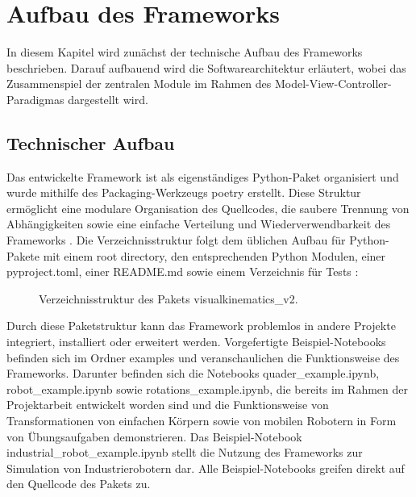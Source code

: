 \section{Aufbau des Frameworks}
In diesem Kapitel wird zunächst der technische Aufbau des Frameworks beschrieben.  
Darauf aufbauend wird die Softwarearchitektur erläutert,
wobei das Zusammenspiel der zentralen Module im Rahmen des Model-View-Controller-Paradigmas dargestellt wird.

\subsection{Technischer Aufbau}
Das entwickelte Framework ist als eigenständiges Python-Paket organisiert und wurde mithilfe des Packaging-Werkzeugs poetry erstellt.
Diese Struktur ermöglicht eine modulare Organisation des Quellcodes,
die saubere Trennung von Abhängigkeiten sowie eine einfache Verteilung und Wiederverwendbarkeit des Frameworks .
Die Verzeichnisstruktur folgt dem üblichen Aufbau für Python-Pakete mit einem root directory, den entsprechenden Python Modulen,
einer pyproject.toml, einer README.md sowie einem Verzeichnis für Tests :

\vspace{1em}
\begin{figure}[H]
\caption{Verzeichnisstruktur des Pakets visualkinematics\_v2.}
\label{fig:dir_structure}
\end{figure}
\vspace{1em}


Durch diese Paketstruktur kann das Framework problemlos in andere Projekte integriert, installiert oder erweitert werden.
Vorgefertigte Beispiel-Notebooks befinden sich im Ordner examples und veranschaulichen die Funktionsweise des Frameworks.
Darunter befinden sich die Notebooks quader\_example.ipynb, robot\_example.ipynb sowie rotations\_example.ipynb,
die bereits im Rahmen der Projektarbeit entwickelt worden sind und die Funktionsweise von Transformationen von einfachen Körpern
sowie von mobilen Robotern in Form von Übungsaufgaben demonstrieren.
Das Beispiel-Notebook industrial\_robot\_example.ipynb stellt die Nutzung des Frameworks zur Simulation von Industrierobotern dar.
Alle Beispiel-Notebooks greifen direkt auf den Quellcode des Pakets zu.

